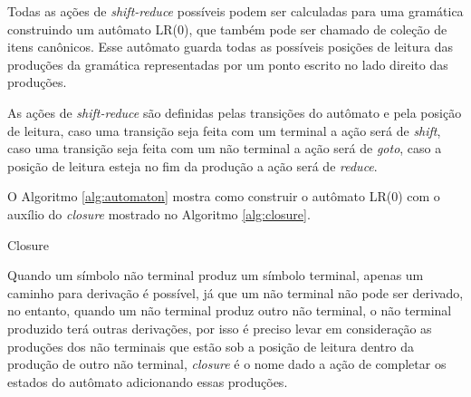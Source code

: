 Todas as ações de \textit{shift-reduce} possíveis podem ser calculadas para uma gramática construindo um autômato LR(0), que também pode ser chamado de coleção de itens canônicos. Esse autômato guarda todas as possíveis posições de leitura das produções da gramática representadas por um ponto escrito no lado direito das produções.

As ações de \textit{shift-reduce} são definidas pelas transições do autômato e pela posição de leitura, caso uma transição seja feita com um terminal a ação será de \textit{shift}, caso uma transição seja feita com um não terminal a ação será de \textit{goto}, caso a posição de leitura esteja no fim da produção a ação será de \textit{reduce}. 

O Algoritmo \ref{alg:automaton} mostra como construir o autômato LR(0) com o auxílio do \textit{closure} mostrado no Algoritmo \ref{alg:closure}.

\begin{algorithm}[ht]
    \caption{Closure}\label{alg:closure}
\end{algorithm}
\FloatBarrier

Quando um símbolo não terminal produz um símbolo terminal, apenas um caminho para derivação é possível, já que um não terminal não pode ser derivado, no entanto, quando um não terminal produz outro não terminal, o não terminal produzido terá outras derivações, por isso é preciso levar em consideração as produções dos não terminais que estão sob a posição de leitura dentro da produção de outro não terminal, \textit{closure} é o nome dado a ação de completar os estados do autômato adicionando essas produções. 

